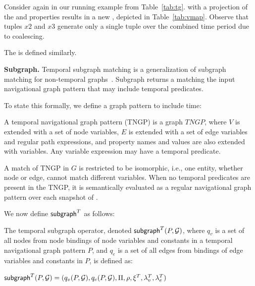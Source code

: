 \begin{example}
Consider again \tg \ttt in our running example from
Table~\ref{tab:tg}.   with a projection of the
 and  properties results in a new \tg,
depicted in Table~\ref{tab:vmap}.  Observe that tuples $x2$ and $x3$
generate only a single tuple over the combined time period due to
coalescing.
\end{example}

The  is defined similarly.

{\bf Subgraph.}  Temporal subgraph matching is a generalization of
subgraph matching for non-temporal graphs~\cite{Wood2012}.  Subgraph
returns a \tg matching the input navigational graph pattern that may
include temporal predicates.

To state this formally, we define a graph pattern to include time:

\begin{definition}
\label{def:tngp}
A temporal navigational graph pattern (TNGP) is a graph $TNGP$, where
$V$ is extended with a set of node variables, $E$ is extended with a
set of edge variables and regular path expressions, and property names
and values are also extended with variables.  Any variable expression
may have a temporal predicate.

A match of TNGP in $G$ is restricted to be isomorphic, i.e., one
entity, whether node or edge, cannot match different variables.
When no temporal predicates are present in the TNGP, it is
  semantically evaluated as a regular navigational graph pattern over
  each snapshot of \ttt.
\end{definition}

We now define $\textsf{subgraph}^T$ as follows:

\begin{definition}
\label{def:subv}
The temporal subgraph operator, denoted $\textsf{subgraph}^T(P,\mathcal{G})$, where $q_v$
is a set of all nodes from node bindings of node variables and
constants in a temporal navigational graph pattern $P$, and $q_e$ is a
set of all edges from bindings of edge variables and constants in $P$,
is defined as:

$\textsf{subgraph}^T(P,\mathcal{G}) = (q_v(P,\mathcal{G}), q_e(P,\mathcal{G}),\Pi,\rho,\xi^T,\lambda^T_v,\lambda^T_e)$
\end{definition}


